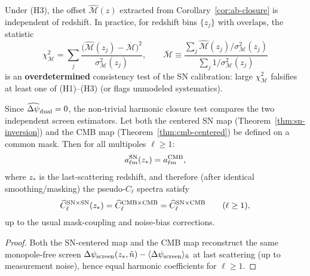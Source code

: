 \begin{corollary}\label{cor:m-constancy}
Under (H3), the offset $\widehat{\mathcal{M}}(z)$ extracted from Corollary~\ref{cor:ab-closure} is independent of redshift. In practice, for redshift bins $\{z_j\}$ with overlaps, the statistic
\begin{equation}
\chi^2_{\mathcal{M}}=\sum_j \frac{\big(\widehat{\mathcal{M}}(z_j)-\overline{\mathcal{M}}\big)^2}{\sigma_{\mathcal{M}}^2(z_j)},
\qquad
\overline{\mathcal{M}}\equiv \frac{\sum_j \widehat{\mathcal{M}}(z_j)/\sigma_{\mathcal{M}}^2(z_j)}{\sum_j 1/\sigma_{\mathcal{M}}^2(z_j)}
\label{eq:closure-chi2-m}
\end{equation}
is an \textbf{overdetermined} consistency test of the SN calibration: large $\chi^2_{\mathcal{M}}$ falsifies at least one of (H1)--(H3) (or flags unmodeled systematics).
\end{corollary}

\begin{corollary}\label{cor:harmonic-closure}
Since $\widehat{\Delta\psi}_{\rm dual}=0$, the non-trivial harmonic closure test compares the two independent screen estimators.
Let both the centered SN map (Theorem~\ref{thm:sn-inversion}) and the CMB map (Theorem~\ref{thm:cmb-centered}) be defined on a common mask. Then for all multipoles $\ell\ge 1$:
\begin{equation}
a_{\ell m}^{\rm SN}(z_\ast)=a_{\ell m}^{\rm CMB},
\label{eq:closure-alm}
\end{equation}
where $z_\ast$ is the last-scattering redshift, and therefore (after identical smoothing/masking) the pseudo-$C_\ell$ spectra satisfy
\begin{equation}
\widehat C_\ell^{\rm SN\times SN}(z_\ast)=\widehat C_\ell^{\rm CMB\times CMB}=
\widehat C_\ell^{\rm SN\times CMB}
\qquad (\ell\ge 1),
\label{eq:closure-cl}
\end{equation}
up to the usual mask-coupling and noise-bias corrections.
\end{corollary}

\begin{proof}
Both the SN-centered map and the CMB map reconstruct the same monopole-free screen $\Delta\psi_{\rm screen}(z_\ast,\hat n)-\langle\Delta\psi_{\rm screen}\rangle_{\hat n}$ at last scattering (up to measurement noise), hence equal harmonic coefficients for $\ell\ge 1$.
\end{proof}

